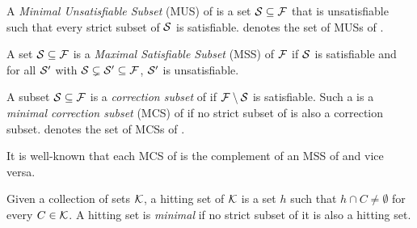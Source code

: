 \begin{definition}
  A \emph{Minimal Unsatisfiable Subset} (MUS) of \F is a set $\mathcal{S} \subseteq \mathcal{F} $  that is unsatisfiable such that every strict subset of $\mathcal{S} $ is satisfiable. 
%   
  \muses{\F} denotes the set of MUSs of \F. 
\end{definition}



\begin{definition}
    A set $\mathcal{S} \subseteq \mathcal{F} $ is a \emph{Maximal Satisfiable Subset} (MSS) of $ \mathcal{F} $ if $\mathcal{S}$ is satisfiable and for all $\mathcal{S}'$ with $\mathcal{S}  \subsetneq  \mathcal{S}'\subseteq\mathcal{F}  $, $\mathcal{S}'$ is unsatisfiable.
\end{definition}

\begin{definition}
    A subset $\mathcal{S} \subseteq \mathcal{F} $ is a \emph{correction subset} of \formula if $\mathcal{F} \setminus\mathcal{S}$ is satisfiable. 
    Such a  is a \emph{minimal correction subset} (MCS)  of \formula if no strict subset of  is also a correction subset. 
    \mcses{\F} denotes the set of MCSs of \F. 
\end{definition}

It is well-known that each  MCS of \formula is the complement of an MSS of \formula and vice versa.

\begin{definition}\label{def:minimal-hs}
    Given a collection of sets $\mathcal{K}$, a hitting set of $\mathcal{K}$ is a set $h$ such that  $h \cap C \neq \emptyset$ for every $C \in \mathcal{K}$. A hitting set is \emph{minimal} if no strict subset of it is also a hitting set. 
\end{definition}



